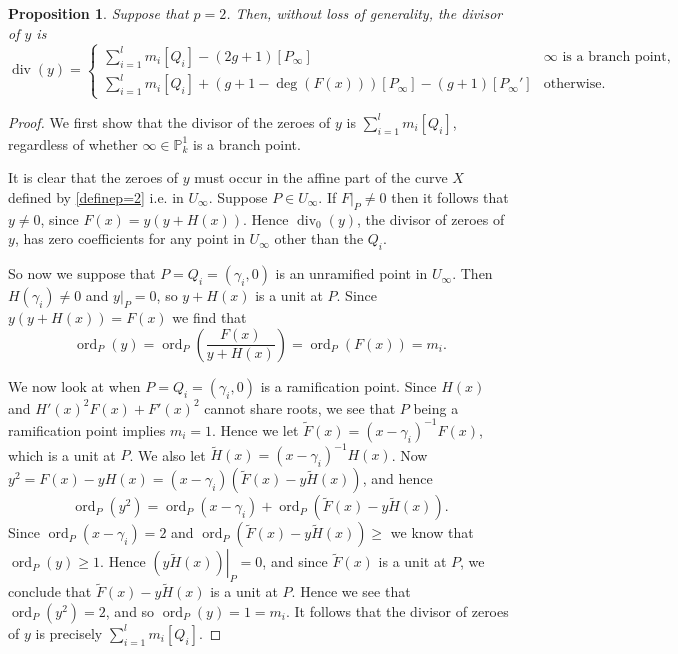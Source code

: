 \documentclass[draft, 11pt]{article} %
\theoremstyle{plain}
\newtheorem{prop}[defn]{Proposition}
\theoremstyle{remark}
\DeclareMathOperator{\ord}{ord}
\DeclareMathOperator{\di}{div}
\begin{document}
\begin{prop}
Suppose that $p=2$.
Then, without loss of generality, the divisor of $y$ is
\begin{equation}\label{divyp=2}
\di(y) = \begin{cases}
 {\displaystyle \sum_{i=1}^l} m_i[Q_i] -(2g+1)[P_\infty] & \text{$\infty$ is a branch point,} \\
 {\displaystyle \sum_{i=1}^l} m_i[Q_i] +(g+1-\deg(F(x)))[P_\infty] - (g+1)[P_\infty'] & \text{otherwise.}
\end{cases}
\end{equation}
\end{prop}
\begin{proof}
We first show that the divisor of the zeroes of $y$ is $\sum_{i=1}^l m_i [Q_i]$, regardless of whether $\infty \in \mathbb P_k^1$ is a branch point.

It is clear that the zeroes of $y$ must occur in the affine part of the curve $X$ defined by \eqref{definep=2} i.e. in $U_\infty$.
Suppose $P\in U_\infty$.
If $\left. F \right|_P \neq 0$ then it follows that $y \neq 0$, since $F(x) = y (y + H(x))$.
Hence $\di_0(y)$, the divisor of zeroes of $y$, has zero coefficients for any point in $U_\infty$ other than the $Q_i$.

So now we suppose that $P= Q_i = (\gamma_i, 0)$ is an unramified point in $U_\infty$.
Then $H(\gamma_i) \neq 0$ and $\left. y \right|_P = 0$, so $y + H(x)$ is a unit at $P$.
Since $y(y+H(x)) = F(x)$ we find that
\begin{equation}\label{unramifiedcoefficient}
\ord_P(y) = \ord_P\left( \frac{F(x)}{y + H(x)} \right) = \ord_P(F(x)) = m_i.
\end{equation}

We now look at when $P = Q_i = (\gamma_i, 0)$ is a ramification point.
Since $H(x)$ and $H'(x)^2F(x) + F'(x)^2$ cannot share roots, we see that $P$ being a ramification point implies $m_i = 1$.
Hence we let $\tilde F(x) = (x- \gamma_i)^{-1}F(x)$, which is a unit at $P$.
We also let $\tilde H(x) = (x- \gamma_i)^{-1}H(x)$.
Now $y^2 = F(x) - y H(x) = (x- \gamma_i) (\tilde F(x) - y \tilde H(x))$, and hence
\[
\ord_P(y^2 ) = \ord_P(x-\gamma_i) + \ord_P(\tilde F(x) - y \tilde H(x)).
\]
Since $\ord_P(x-\gamma_i) = 2$ and $\ord_P(\tilde F(x) - y \tilde H(x)) \geq$ we know that $\ord_P(y) \geq 1$.
Hence $\left. (y \tilde H(x)) \right|_P = 0$, and since $\tilde F(x)$ is a unit at $P$, we conclude that $\tilde F(x) - y \tilde H(x)$ is a unit at $P$.
Hence we see that $\ord_P(y^2) = 2$, and so $\ord_P(y) = 1 = m_i$.
It follows that the divisor of zeroes of $y$ is precisely $\sum_{i=1}^l m_i [Q_i]$.


\end{proof}
\end{document}
